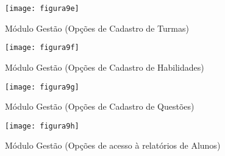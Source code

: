                                     \begin{figure}[!h]
                                        \centering
                                        \caption{  Módulo Gestão (Opções de Cadastro de Turmas)  }%
                                        \label{fig:figura9e}
                                        \texttt{[image: figura9e]}
                                        \end{figure}
 
                                        \begin{figure}[!h]
                                            \centering
                                            \caption{  Módulo Gestão (Opções de Cadastro de Habilidades)  }%
                                            \label{fig:figura9f}
                                            \texttt{[image: figura9f]}
                                            \end{figure}
 
                                            \begin{figure}[!h]
                                                \centering
                                                \caption{ Módulo Gestão (Opções de Cadastro de Questões)  }%
                                                \label{fig:figura9g}
                                                \texttt{[image: figura9g]}
                                                \end{figure}
 
                                                \begin{figure}[!h]
                                                    \centering
                                                    \caption{  Módulo Gestão (Opções de acesso à relatórios de Alunos)  }%
                                                    \label{fig:figura9h}
                                                    \texttt{[image: figura9h]}
                                                    \end{figure}
                                                    \clearpage

